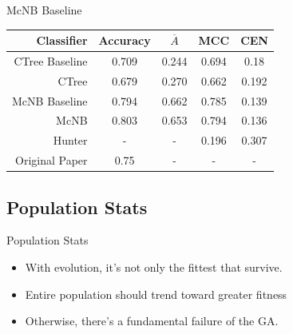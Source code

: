 \documentclass{beamer}
\makeatletter
\newcommand*{\currentname}{\@currentlabelname}
\makeatother
\begin{document}
\begin{frame}{\currentname{: }McNB Baseline}
	\begin{tabular}{|r|c|c|c|c|}
		\hline
		Classifier&Accuracy&\(\overline{A}\)&MCC&CEN\\
		\hline
		CTree Baseline&0.709&0.244&0.694&0.18\\
		CTree &0.679&0.270 & 0.662 & 0.192\\
		McNB Baseline & 0.794 & 0.662 & 0.785&0.139\\
		McNB & 0.803 & 0.653 & 0.794 & 0.136\\
		Hunter & - & - & 0.196 & 0.307\\
		Original Paper & 0.75 & - & - & -\\\hline
	\end{tabular}
\end{frame}
\subsection{Population Stats}
\begin{frame}{Population Stats}
\begin{itemize}
	\item With evolution, it's not only the fittest that survive.
	\item Entire population should trend toward greater fitness
	\item Otherwise, there's a fundamental failure of the GA.
\end{itemize}	
\end{frame}
\end{document}
